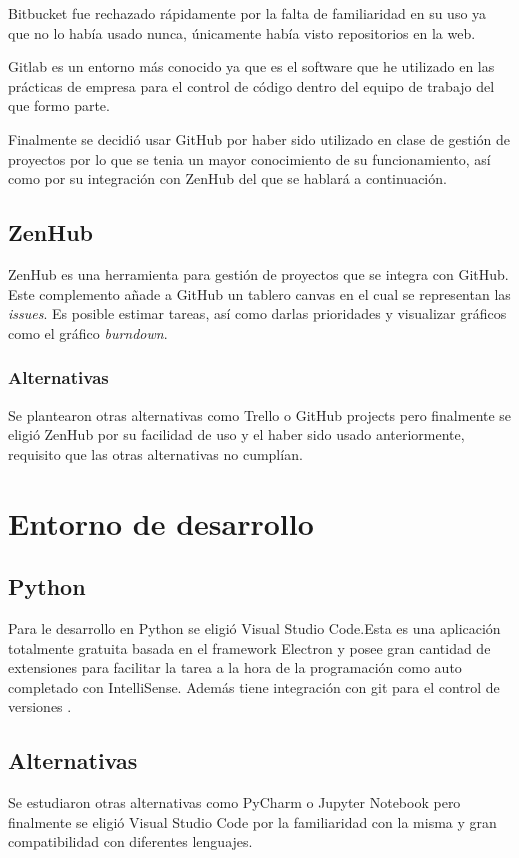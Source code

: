 Bitbucket fue rechazado rápidamente por la falta de familiaridad en su uso ya que no lo había usado nunca, únicamente había visto repositorios en la web.

Gitlab es un entorno más conocido ya que es el software que he utilizado en las prácticas de empresa para el control de código dentro del equipo de trabajo del que formo parte.

Finalmente se decidió usar GitHub por haber sido utilizado en clase de gestión de proyectos por lo que se tenia un mayor conocimiento de su funcionamiento, así como por su integración con ZenHub del que se hablará a continuación.

\subsection{ZenHub}\label{ZenHub}
ZenHub es una herramienta para gestión de proyectos que se integra con GitHub. Este complemento añade a GitHub un tablero canvas en el cual se representan las \emph{issues}. Es posible estimar tareas, así como darlas prioridades y visualizar gráficos como el gráfico \emph{burndown}. \cite{zenhub}

\subsubsection{Alternativas}\label{AlternativasZotero}
Se plantearon otras alternativas como Trello o GitHub projects pero finalmente se eligió  ZenHub por su facilidad de uso y el haber sido usado anteriormente, requisito que las otras alternativas no cumplían.

\section{Entorno de desarrollo}\label{IDE}
	\subsection{Python}\label{Python}
Para le desarrollo en Python se eligió Visual Studio Code.Esta es una aplicación totalmente gratuita basada en el framework Electron y posee gran cantidad de extensiones para facilitar la tarea a la hora de la programación como auto completado con IntelliSense. Además tiene integración con git para el control de versiones \cite{wiki:vscode_wiki,vscode}.

\subsection{Alternativas}\label{AlternativasIDE}
Se estudiaron otras alternativas como PyCharm o Jupyter Notebook pero finalmente se eligió Visual Studio Code por la familiaridad con la misma y gran compatibilidad con diferentes lenguajes.

